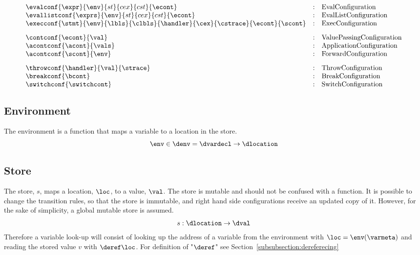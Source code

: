 \documentclass{article}
\begin{document}
\[
\begin{array}{lcl}
\evalconf{\expr}{\env}{st}{cex}{cst}{\econt} & : &
\textrm{EvalConfiguration}\\

\evallistconf{\exprs}{\env}{st}{cex}{cst}{\econt} & : & 
\textrm{EvalListConfiguration} \\

\execconf{\stmt}{\env}{\lbls}{\clbls}{\handler}{\cex}{\cstrace}{\econt}{\scont}  & : & 
\textrm{ExecConfiguration}\\[3mm]

\contconf{\econt}{\val} & : & 
\textrm{ValuePassingConfiguration} \\

\acontconf{\acont}{\vals}& : & 
\textrm{ApplicationConfiguration} \\

\acontconf{\scont}{\env} & : & 
\textrm{ForwardConfiguration} \\[3mm]

\throwconf{\handler}{\val}{\strace} & : & 
\textrm{ThrowConfiguration} \\

\breakconf{\bcont} & : & 
\textrm{BreakConfiguration} \\

\switchconf{\switchcont} & : & 
 \textrm{SwitchConfiguration}\\

\end{array}
\]
\subsection{Environment}
\label{subsec:env-definition}
The environment is a function that maps a variable to a location in the store.
\[\env \in \denv = \dvardecl \rightarrow \dlocation\] 
\subsection{Store}
\label{subsec:store-definition}
The store, $s$, maps a location, $\loc$, to a value, $\val$. The store is mutable and should not be confused with a function. It is possible to change the transition rules, so that the store is immutable, and right hand side configurations receive an updated copy of it. However, for the sake of simplicity, a global mutable store is assumed. 
\[s : \dlocation \rightarrow \dval \]
Therefore a variable look-up will consist of looking up the address of a variable from the environment with $\loc = \env(\varmeta)$ and reading the stored value $v$ with $\deref\loc$. For definition of "$\deref$" see Section~\ref{subsubsection:dereferecing} 
\end{document}
